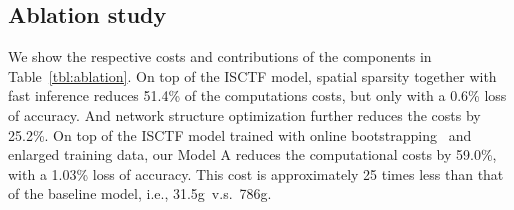 \documentclass[10pt,twocolumn,letterpaper]{article}
\begin{document}
%
\subsection{Ablation study}
We show the respective costs and contributions of the components in Table~\ref{tbl:ablation}.
On top of the ISCTF model,
spatial sparsity together with fast inference reduces 51.4\% of the computations costs,
but only with a 0.6\% loss of accuracy.
And network structure optimization further reduces the costs by 25.2\%.
On top of the ISCTF model trained with online bootstrapping~\cite{InstanceSegmentation.2016.Wu} and enlarged training data,
our Model A reduces the computational costs by 59.0\%, with a 1.03\% loss of accuracy.
This cost is approximately 25 times less than that of the baseline model, i.e., 31.5g~v.s.~786g.
%
%

%
%
\end{document}
